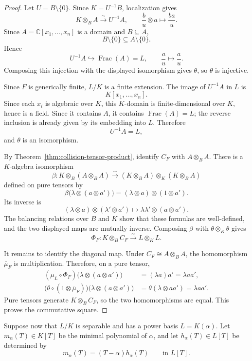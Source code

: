 \documentclass[11pt]{article}
\theoremstyle{remark}
\theoremstyle{definition}
\DeclareMathOperator{\Frac}{Frac}
\newcommand{\C}{\mathbb C}
\begin{document}
\begin{proof}
Let \(U=B\setminus\{0\}\).  Since \(K=U^{-1}B\), localization gives
\[
  K\otimes_BA
  \xrightarrow{\sim}
  U^{-1}A,
  \qquad
  \frac{b}{u}\otimes a\longmapsto\frac{ba}{u}.
\]
Since \(A=\C[x_1,\dots,x_n]\) is a domain and \(B\subseteq A\),
\[
  B\setminus\{0\}\subseteq A\setminus\{0\}.
\]
Hence
\[
  U^{-1}A\hookrightarrow\Frac(A)=L,
  \qquad
  \frac{a}{u}\longmapsto\frac{a}{u}.
\]
Composing this injection with the displayed isomorphism gives
\(\theta\), so \(\theta\) is injective.

Since \(F\) is generically finite, \(L/K\) is a finite extension.  The
image of \(U^{-1}A\) in \(L\) is
\[
  K[x_1,\dots,x_n].
\]
Since each \(x_i\) is algebraic over \(K\), this \(K\)-domain is
finite-dimensional over \(K\), hence is a field.  Since it contains
\(A\), it contains \(\Frac(A)=L\); the reverse inclusion is already
given by its embedding into \(L\).  Therefore
\[
  U^{-1}A=L,
\]
and \(\theta\) is an isomorphism.

By Theorem~\ref{thm:collision-tensor-product}, identify
\(C_F\) with \(A\otimes_BA\).  There is a \(K\)-algebra isomorphism
\[
  \beta\colon
  K\otimes_B(A\otimes_BA)
  \xrightarrow{\sim}
  (K\otimes_BA)\otimes_K(K\otimes_BA)
\]
defined on pure tensors by
\[
  \beta\bigl(\lambda\otimes(a\otimes a')\bigr)
  =
  (\lambda\otimes a)\otimes(1\otimes a').
\]
Its inverse is
\[
  (\lambda\otimes a)\otimes(\lambda'\otimes a')
  \longmapsto
  \lambda\lambda'\otimes(a\otimes a').
\]
The balancing relations over \(B\) and \(K\) show that these formulas
are well-defined, and the two displayed maps are mutually inverse.
Composing \(\beta\) with \(\theta\otimes_K\theta\) gives
\[
  \Phi_F\colon K\otimes_BC_F\xrightarrow{\sim}L\otimes_KL.
\]

It remains to identify the diagonal map.  Under
\(C_F\cong A\otimes_BA\), the homomorphism \(\bar\mu_F\) is
multiplication.  Therefore, on a pure tensor,
\[
  \begin{aligned}
  (\mu_L\circ\Phi_F)
    \bigl(\lambda\otimes(a\otimes a')\bigr)
    &=(\lambda a)a'
     =\lambda aa',\\
  \bigl(\theta\circ(1\otimes\bar\mu_F)\bigr)
    \bigl(\lambda\otimes(a\otimes a')\bigr)
    &=\theta(\lambda\otimes aa')
     =\lambda aa'.
  \end{aligned}
\]
Pure tensors generate \(K\otimes_BC_F\), so the two homomorphisms are
equal.  This proves the commutative square.
\end{proof}

Suppose now that \(L/K\) is separable and has a power basis
\(L=K(\alpha)\).  Let \(m_\alpha(T)\in K[T]\) be the minimal polynomial
of \(\alpha\), and let \(h_\alpha(T)\in L[T]\) be determined by
\[
  m_\alpha(T)=(T-\alpha)h_\alpha(T)
  \qquad\text{in }L[T].
\]
\end{document}
